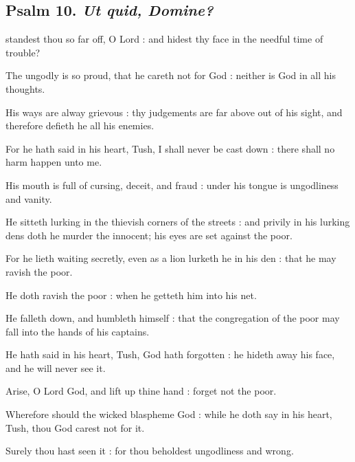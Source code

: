 \clearpage
\subsection{Psalm 10. \textit{Ut quid, Domine?}}


 standest thou so far off, O Lord : and hidest thy face in the needful time of trouble?\par
{}
The ungodly is so proud, that he careth not for God : neither is God in all his thoughts.\par
{}His ways are alway grievous : thy judgements are far above out of his sight, and therefore defieth he all his enemies.\par
{}For he hath said in his heart, Tush, I shall never be cast down : there shall no harm happen unto me.\par
{}His mouth is full of cursing, deceit, and fraud : under his tongue is ungodliness and vanity.\par
{}He sitteth lurking in the thievish corners of the streets : and privily in his lurking dens doth he murder the innocent; his eyes are set against the poor.\par
{}For he lieth waiting secretly, even as a lion lurketh he in his den : that he may ravish the poor.\par
{}He doth ravish the poor : when he getteth him into his net.\par
{}He falleth down, and humbleth himself : that the congregation of the poor may fall into the hands of his captains.\par
{}He hath said in his heart, Tush, God hath forgotten : he hideth away his face, and he will never see it.\par
{}Arise, O Lord God, and lift up thine hand : forget not the poor.\par
{}Wherefore should the wicked blaspheme God : while he doth say in his heart, Tush, thou God carest not for it.\par
{}Surely thou hast seen it : for thou beholdest ungodliness and wrong.\par
